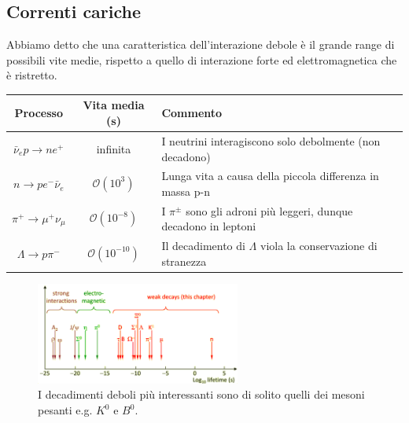 \subsection{Correnti cariche}
Abbiamo detto che una caratteristica dell'interazione debole è il grande range di possibili vite medie, rispetto a quello di interazione forte ed elettromagnetica che è ristretto.
\begin{table}[h!]
    \centering
    \begin{tabular}{|c|c|l|}
        \hline
        \textbf{Processo} & \textbf{Vita media (s)} & \textbf{Commento} \\
        \hline
        $\bar{\nu}_e p \to n e^+$ & infinita & I neutrini interagiscono solo debolmente (non decadono) \\
        \hline
        $n \to p e^- \bar{\nu}_e$ & $\mathcal{O}(10^3)$ & Lunga vita a causa della piccola differenza in massa p-n \\
        \hline
        $\pi^+ \to \mu^+ \nu_\mu$ & $\mathcal{O}(10^{-8})$ & I $\pi^\pm$ sono gli adroni più leggeri, dunque decadono in leptoni\\
        \hline
        $\Lambda \to p \pi^-$ & $\mathcal{O}(10^{-10})$ & Il decadimento di $\Lambda$ viola la conservazione di stranezza \\
        \hline
    \end{tabular}
\end{table}
\begin{figure}[H]
    \centering
    \includegraphics[width=0.6\textwidth]{immagini/fig_decay_sketch.png}
    \caption{I decadimenti deboli più interessanti sono di solito quelli dei mesoni pesanti e.g. $K^0$ e $ B^0$.}
\end{figure}
